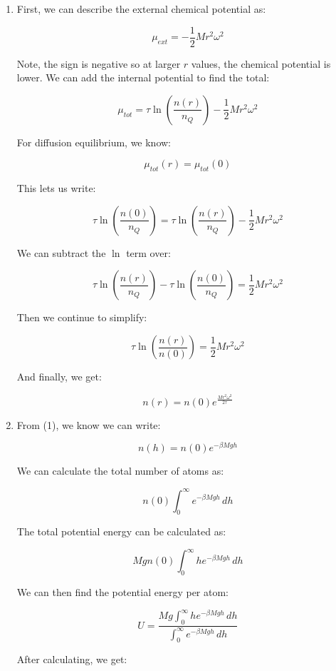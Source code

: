 \begin{enumerate}

  \item

    First, we can describe the external chemical potential as:

    $$\mu_{ext}=-\frac{1}{2}Mr^2\omega^2$$

    Note, the sign is negative so at larger $r$ values, the chemical potential is lower. We can add the internal potential to find the total:

    $$\mu_{tot}=\tau\ln\left( \frac{n(r)}{n_Q} \right)-\frac{1}{2}Mr^2\omega^2$$

    For diffusion equilibrium, we know:

    $$\mu_{tot}(r)=\mu_{tot}(0)$$

    This lets us write:

    $$\tau\ln\left( \frac{n(0)}{n_Q} \right)=\tau\ln\left( \frac{n(r)}{n_Q} \right)-\frac{1}{2}Mr^2\omega^2$$

    We can subtract the $\ln$ term over:

    $$\tau\ln\left( \frac{n(r)}{n_Q} \right)-\tau\ln\left( \frac{n(0)}{n_Q} \right)=\frac{1}{2}Mr^2\omega^2$$

    Then we continue to simplify:

    $$\tau\ln\left( \frac{n(r)}{n(0)} \right)=\frac{1}{2}Mr^2\omega^2$$

    And finally, we get:

    $$\boxed{n(r)=n(0)e^{\frac{Mr^2\omega^2}{2\tau}}}$$

    \setcounter{enumi}{2}

  \item

    From (1), we know we can write:

    $$n(h)=n(0)e^{-\beta Mgh}$$

    We can calculate the total number of atoms as:

    $$n(0)\int_0^\infty e^{-\beta Mgh}\,dh$$

    The total potential energy can be calculated as:

    $$Mgn(0)\int_0^\infty he^{-\beta Mgh}\,dh$$

    We can then find the potential energy per atom:

    $$U=\frac{Mg\displaystyle\int_0^\infty he^{-\beta Mgh}\,dh}{\displaystyle\int_0^\infty e^{-\beta Mgh}\,dh}$$

    After calculating, we get:


\end{enumerate}
